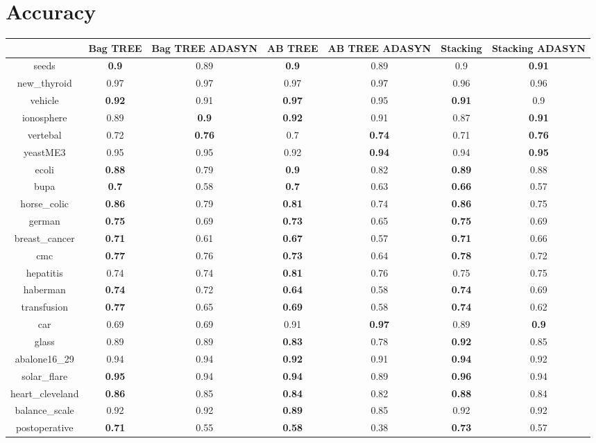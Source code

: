 \documentclass{article}%
\begin{document}
%
\normalsize%
\section*{Accuracy}%
\begin{tabular}{c|cccccc}%
&Bag TREE&Bag TREE ADASYN&AB TREE&AB TREE ADASYN&Stacking&Stacking ADASYN\\%
\hline%
seeds&\textbf{0.9}&0.89&\textbf{0.9}&0.89&0.9&\textbf{0.91}\\%
new\_thyroid&0.97&0.97&0.97&0.97&0.96&0.96\\%
vehicle&\textbf{0.92}&0.91&\textbf{0.97}&0.95&\textbf{0.91}&0.9\\%
ionosphere&0.89&\textbf{0.9}&\textbf{0.92}&0.91&0.87&\textbf{0.91}\\%
vertebal&0.72&\textbf{0.76}&0.7&\textbf{0.74}&0.71&\textbf{0.76}\\%
yeastME3&0.95&0.95&0.92&\textbf{0.94}&0.94&\textbf{0.95}\\%
ecoli&\textbf{0.88}&0.79&\textbf{0.9}&0.82&\textbf{0.89}&0.88\\%
bupa&\textbf{0.7}&0.58&\textbf{0.7}&0.63&\textbf{0.66}&0.57\\%
horse\_colic&\textbf{0.86}&0.79&\textbf{0.81}&0.74&\textbf{0.86}&0.75\\%
german&\textbf{0.75}&0.69&\textbf{0.73}&0.65&\textbf{0.75}&0.69\\%
breast\_cancer&\textbf{0.71}&0.61&\textbf{0.67}&0.57&\textbf{0.71}&0.66\\%
cmc&\textbf{0.77}&0.76&\textbf{0.73}&0.64&\textbf{0.78}&0.72\\%
hepatitis&0.74&0.74&\textbf{0.81}&0.76&0.75&0.75\\%
haberman&\textbf{0.74}&0.72&\textbf{0.64}&0.58&\textbf{0.74}&0.69\\%
transfusion&\textbf{0.77}&0.65&\textbf{0.69}&0.58&\textbf{0.74}&0.62\\%
car&0.69&0.69&0.91&\textbf{0.97}&0.89&\textbf{0.9}\\%
glass&0.89&0.89&\textbf{0.83}&0.78&\textbf{0.92}&0.85\\%
abalone16\_29&0.94&0.94&\textbf{0.92}&0.91&\textbf{0.94}&0.92\\%
solar\_flare&\textbf{0.95}&0.94&\textbf{0.94}&0.89&\textbf{0.96}&0.94\\%
heart\_cleveland&\textbf{0.86}&0.85&\textbf{0.84}&0.82&\textbf{0.88}&0.84\\%
balance\_scale&0.92&0.92&\textbf{0.89}&0.85&0.92&0.92\\%
postoperative&\textbf{0.71}&0.55&\textbf{0.58}&0.38&\textbf{0.73}&0.57\\%
\end{tabular}
\end{document}

